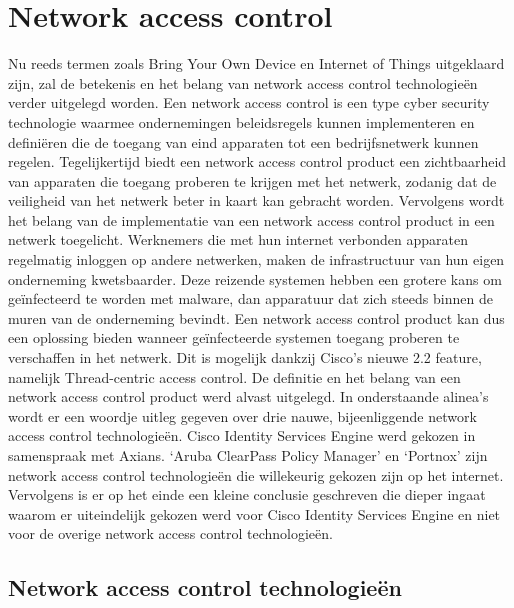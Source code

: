 \section{Network access control}
Nu reeds termen zoals Bring Your Own Device en Internet of Things uitgeklaard zijn, zal de betekenis en het belang van network access control technologieën verder uitgelegd worden.
\newline
\newline 
Een network access control is een type cyber security technologie waarmee ondernemingen beleidsregels kunnen implementeren en definiëren die de toegang van eind apparaten tot een bedrijfsnetwerk kunnen regelen. Tegelijkertijd biedt een network access control product een zichtbaarheid van apparaten die toegang proberen te krijgen met het netwerk, zodanig dat de veiligheid van het netwerk beter in kaart kan gebracht worden. Vervolgens wordt het belang van de implementatie van een network access control product in een netwerk toegelicht.
\newline
\newline 
Werknemers die met hun internet verbonden apparaten regelmatig inloggen op andere netwerken, maken de infrastructuur van hun eigen onderneming kwetsbaarder. Deze reizende systemen hebben een grotere kans om geïnfecteerd te worden met malware, dan apparatuur dat zich steeds binnen de muren van de onderneming bevindt. Een network access control product kan dus een oplossing bieden wanneer geïnfecteerde systemen toegang proberen te verschaffen in het netwerk. Dit is mogelijk dankzij Cisco's nieuwe 2.2 feature, namelijk Thread-centric access control. 
\newline
\newline 
De definitie en het belang van een network access control product werd alvast uitgelegd. In onderstaande alinea’s wordt er een woordje uitleg gegeven over drie nauwe, bijeenliggende network access control technologieën. Cisco Identity Services Engine werd gekozen in samenspraak met Axians. ‘Aruba ClearPass Policy Manager’ en ‘Portnox’ zijn network access control technologieën die willekeurig gekozen zijn op het internet. Vervolgens is er op het einde een kleine conclusie geschreven die dieper ingaat waarom er uiteindelijk gekozen werd voor Cisco Identity Services Engine en niet voor de overige network access control technologieën.

\subsection{Network access control technologieën}
